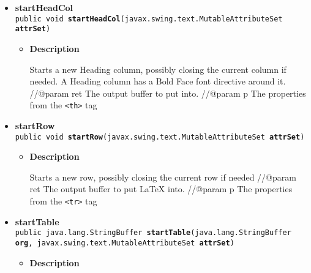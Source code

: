 \documentclass[11pt,a4paper]{report}
\begin{document}
{{{{\begin{itemize}
{\begin{itemize}
{Starts a new column, possibly closing the current column if needed //@param ret The output buffer to put \LaTeXe{} into. //@param p the properties from the \texttt{\small \textless td\textgreater } tag
}
\end{itemize}
}%
\item{ 
\hypertarget{org.stfm.texdoclet.TableInfo.startHeadCol(javax.swing.text.MutableAttributeSet)}{{\bf  startHeadCol}\\}
\texttt{public void\ {\bf  startHeadCol}(\texttt{javax.swing.text.MutableAttributeSet} {\bf  attrSet})
\label{org.stfm.texdoclet.TableInfo.startHeadCol(javax.swing.text.MutableAttributeSet)}}%
\begin{itemize}
\item{
{\bf  Description}

Starts a new Heading column, possibly closing the current column if needed. A Heading column has a Bold Face font directive around it. //@param ret The output buffer to put \LaTeXe{} into. //@param p The properties from the \texttt{\small \textless th\textgreater } tag
}
\end{itemize}
}%
\item{ 
\hypertarget{org.stfm.texdoclet.TableInfo.startRow(javax.swing.text.MutableAttributeSet)}{{\bf  startRow}\\}
\texttt{public void\ {\bf  startRow}(\texttt{javax.swing.text.MutableAttributeSet} {\bf  attrSet})
\label{org.stfm.texdoclet.TableInfo.startRow(javax.swing.text.MutableAttributeSet)}}%
\begin{itemize}
\item{
{\bf  Description}

Starts a new row, possibly closing the current row if needed //@param ret The output buffer to put \LaTeX{} into. //@param p The properties from the \texttt{\small \textless tr\textgreater } tag
}
\end{itemize}
}%
\item{ 
\hypertarget{org.stfm.texdoclet.TableInfo.startTable(java.lang.StringBuffer, javax.swing.text.MutableAttributeSet)}{{\bf  startTable}\\}
\texttt{public java.lang.StringBuffer\ {\bf  startTable}(\texttt{java.lang.StringBuffer} {\bf  org},
\texttt{javax.swing.text.MutableAttributeSet} {\bf  attrSet})
\label{org.stfm.texdoclet.TableInfo.startTable(java.lang.StringBuffer, javax.swing.text.MutableAttributeSet)}}%
\begin{itemize}
\item{
{\bf  Description}

}
\end{itemize}}
\end{itemize}}}}}
\end{document}
